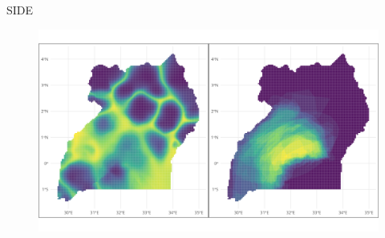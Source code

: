 \documentclass{beamer}
\begin{document}
\begin{frame}{SIDE}

\begin{figure}[htpb]
	\centering
	\includegraphics[width=\linewidth]{img/ugaplots.png}
\end{figure}	

\end{frame}



\end{document}
